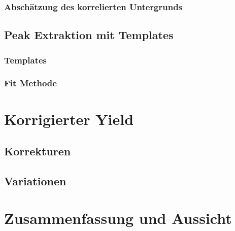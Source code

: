 \documentclass[]{article}
\begin{document}
	\subsubsection{Absch{\"a}tzung des korrelierten Untergrunds}
	\subsection{Peak Extraktion mit Templates}
	\subsubsection{Templates}
	\subsubsection{Fit Methode}
	\section{Korrigierter Yield}
	\subsection{Korrekturen}
	\subsection{Variationen}
	\section{Zusammenfassung und Aussicht}
\end{document}
